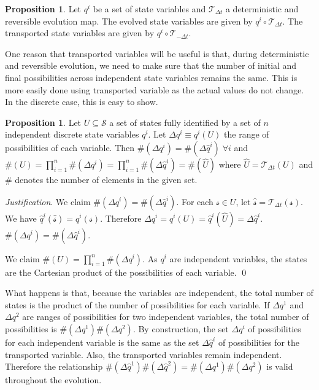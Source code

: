 \documentclass[aps,pra,10pt,twocolumn,floatfix,nofootinbib]{revtex4-1}
\numberwithin{equation}{section}
\theoremstyle{definition}
\newtheorem{prop}[equation]{Proposition}
\newenvironment{justification}{\emph{Justification}.}{\qed}
\begin{document}
\begin{prop}\label{prop:evolved_transported_variable}
Let $q^i$ be a set of state variables and $\mathcal{T}_{\Delta t}$ a deterministic and reversible evolution map. The evolved state variables are given by $q^i \circ \mathcal{T}_{\Delta t}$. The transported state variables are given by $q^i \circ \mathcal{T}_{-\Delta t}$.
\end{prop}

One reason that transported variables will be useful is that, during deterministic and reversible evolution, we need to make sure that the number of initial and final possibilities across independent state variables remains the same. This is more easily done using transported variable as the actual values do not change. In the discrete case, this is easy to show.

\begin{prop}\label{prop:discrete_measure}
	Let $U \subseteq \mathcal{S}$ a set of states fully identified by a set of $n$ independent discrete state variables $q^i$. Let $\Delta q^i \equiv q^i(U)$ the range of possibilities of each variable. Then $\#(\Delta q^i)=\#(\Delta \hat{q}^i) \; \forall i$ and $\#(U)=\prod\limits_{i=1}^{n}\#(\Delta q^i)=\prod\limits_{i=1}^{n}\#(\Delta \hat{q}^i)=\#(\hat{U})$ where $\hat{U}=\mathcal{T}_{\Delta t}(U)$ and $\#$ denotes the number of elements in the given set.
\end{prop}

\begin{justification}
	We claim $\#(\Delta q^i)=\#(\Delta \hat{q}^i)$. For each $\mathcal{s} \in U$, let $\hat{\mathcal{s}}=\mathcal{T}_{\Delta t}(\mathcal{s})$. We have $\hat{q}^i(\hat{\mathcal{s}}) = q^i(\mathcal{s})$. Therefore $\Delta q^i = q^i(U) = \hat{q}^i(\hat{U})=\Delta \hat{q}^i$. $\#(\Delta q^i)=\#(\Delta \hat{q}^i)$.
	
	We claim $\#(U)=\prod\limits_{i=1}^{n}\#(\Delta q^i)$. As $q^i$ are independent variables, the states are the Cartesian product of the possibilities of each variable.
\end{justification}

What happens is that, because the variables are independent, the total number of states is the product of the number of possibilities for each variable. If $\Delta q^1$ and $\Delta q^2$ are ranges of possibilities for two independent variables, the total number of possibilities is $\#(\Delta q^1) \#(\Delta q^2)$. By construction, the set $\Delta q^i$ of possibilities for each independent variable is the same as the set $\Delta \hat{q}^i$ of possibilities for the transported variable. Also, the transported variables remain independent. Therefore the relationship $\#(\Delta \hat{q}^1) \#(\Delta \hat{q}^2) = \#(\Delta q^1) \#(\Delta q^2)$ is valid throughout the evolution.
\end{document}
